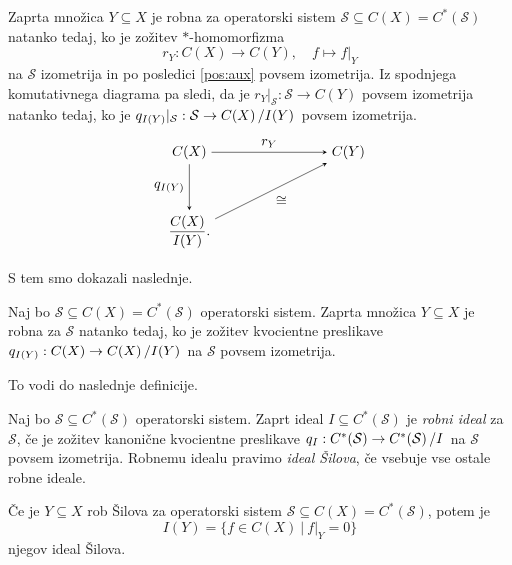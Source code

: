 Zaprta množica $Y \subseteq X$ je robna za operatorski sistem $\mathcal{S} \subseteq C(X) = C^*(\mathcal{S})$ natanko tedaj, ko je zožitev $*$-homomorfizma 
$$r_Y: C(X) \to C(Y),\quad f \mapsto f|_Y$$
na $\mathcal{S}$ izometrija in po posledici \ref{pos:aux} povsem izometrija.
Iz spodnjega komutativnega diagrama pa sledi, da je $r_Y |_{\mathcal{S}}: \mathcal{S} \to C(Y)$
povsem izometrija natanko tedaj, ko je $q_{I(Y)} |_{\mathcal{S}}: \mathcal{S} \to \quot{C(X)}{I(Y)}$ povsem izometrija.
\begin{equation}\label{eq:aux}
    \begin{tikzpicture}[>=stealth]

        \node (CX) at (0,2) {$C(X)$};
        \node (CY) at (4,2) {$C(Y)$};
        \node (Q)  at (0,0) {$\displaystyle \frac{C(X)}{I(Y)}.$};
        
        \draw[->] (CX) -- node[above] {$r_Y$} (CY);
        
        \draw[->] (CX) -- node[left] {$q_{I(Y)}$} (Q);
        
        \draw[->] (Q) -- node[below right] {$\cong$} (CY);
        
        \end{tikzpicture}    
\end{equation}
S tem smo dokazali naslednje.
\begin{trditev}\label{trd:aux}
    Naj bo $\mathcal{S} \subseteq C(X) = C^*(\mathcal{S})$ operatorski sistem.
    Zaprta množica $Y \subseteq X$ je robna za $\mathcal{S}$
    natanko tedaj, ko je zožitev kvocientne preslikave $q_{I(Y)}: C(X) \to \quot{C(X)}{I(Y)}$ na $\mathcal{S}$ povsem izometrija.
\end{trditev}

To vodi do naslednje definicije.

\begin{definicija}\label{def:2.1}
    Naj bo $\mathcal{S} \subseteq C^*(\mathcal{S})$ operatorski sistem.
    Zaprt ideal $I \subseteq C^*(\mathcal{S})$ je \emph{robni ideal} za $\mathcal{S}$,
    če je zožitev kanonične kvocientne preslikave
    $q_I : C^*(\mathcal{S}) \to \quot{C^*(\mathcal{S})}{I}$
    na $\mathcal{S}$ povsem izometrija.
    Robnemu idealu pravimo \emph{ideal Šilova}, če vsebuje vse ostale robne ideale.
\end{definicija}

\begin{zgled}
    Če je $Y \subseteq X$ rob Šilova za operatorski sistem $\mathcal{S} \subseteq C(X) = C^*(\mathcal{S})$,
    potem je 
    $$I(Y) = \{f \in C(X)\ |\ f|_{Y} = 0\}$$
    njegov ideal Šilova.
\end{zgled}

